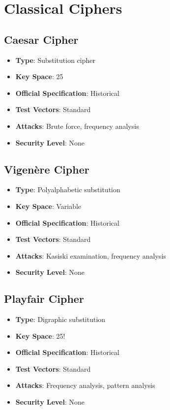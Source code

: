 \documentclass[11pt,a4paper]{article}
\begin{document}
\section{Classical Ciphers}

\subsection{Caesar Cipher}
\begin{itemize}
    \item \textbf{Type}: Substitution cipher
    \item \textbf{Key Space}: 25
    \item \textbf{Official Specification}: Historical
    \item \textbf{Test Vectors}: Standard
    \item \textbf{Attacks}: Brute force, frequency analysis
    \item \textbf{Security Level}: None
\end{itemize}

\subsection{Vigenère Cipher}
\begin{itemize}
    \item \textbf{Type}: Polyalphabetic substitution
    \item \textbf{Key Space}: Variable
    \item \textbf{Official Specification}: Historical
    \item \textbf{Test Vectors}: Standard
    \item \textbf{Attacks}: Kasiski examination, frequency analysis
    \item \textbf{Security Level}: None
\end{itemize}

\subsection{Playfair Cipher}
\begin{itemize}
    \item \textbf{Type}: Digraphic substitution
    \item \textbf{Key Space}: 25!
    \item \textbf{Official Specification}: Historical
    \item \textbf{Test Vectors}: Standard
    \item \textbf{Attacks}: Frequency analysis, pattern analysis
    \item \textbf{Security Level}: None
\end{itemize}
\end{document}
